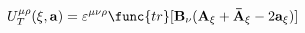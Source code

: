 \begin{equation}
U_{T}^{\mu \rho }(\xi ,{\bf a})=\varepsilon ^{\mu \nu \rho }
\func{tr}[{\bf B}_{\nu }({\bf A}_{\xi }+{\bf \bar{A}}_{\xi }-2{\bf
a}_{\xi })]
\end{equation}

